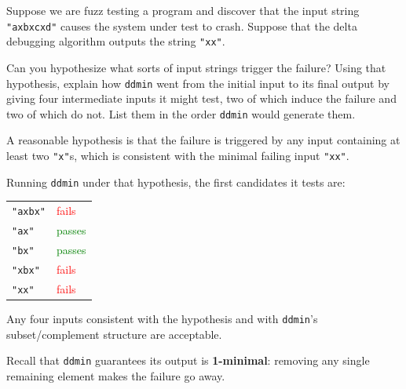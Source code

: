 \documentclass[addpoints, answers]{exam}
\newcommand{\Code}[1]{\texttt{#1}}
\begin{document}
\begin{questions}
\begin{parts}
\end{parts}

\newpage

\question[5] Suppose we are fuzz testing a program and discover that the
  input string \Code{"axbxcxd"} causes the system under test to crash.
  Suppose that the delta debugging algorithm outputs the string
  \Code{"xx"}.

  Can you hypothesize what sorts of input strings trigger the failure?
  Using that hypothesis, explain how \Code{ddmin} went from the initial
  input to its final output by giving four intermediate inputs it might
  test, two of which induce the failure and two of which do not. List
  them in the order \Code{ddmin} would generate them.
  \begin{solution} %
    A reasonable hypothesis is that the failure is triggered by any
    input containing at least two \Code{"x"}s, which is consistent with
    the minimal failing input \Code{"xx"}.

    Running \Code{ddmin} under that hypothesis, the first candidates it
    tests are:

    \begin{center}
      \begin{tabular}{ll}
        \Code{"axbx"} & \textcolor{red}{fails} \\
        \Code{"ax"}   & \textcolor{green}{passes} \\
        \Code{"bx"}   & \textcolor{green}{passes} \\
        \Code{"xbx"}  & \textcolor{red}{fails} \\
        \Code{"xx"}   & \textcolor{red}{fails} \\
      \end{tabular}
    \end{center}

    Any four inputs consistent with the hypothesis and with
    \Code{ddmin}'s subset/complement structure are acceptable.
  \end{solution}


\question Recall that \Code{ddmin} guarantees its output is
  \textbf{1-minimal}: removing any single remaining element makes the
  failure go away.


\end{questions}
\end{document}
